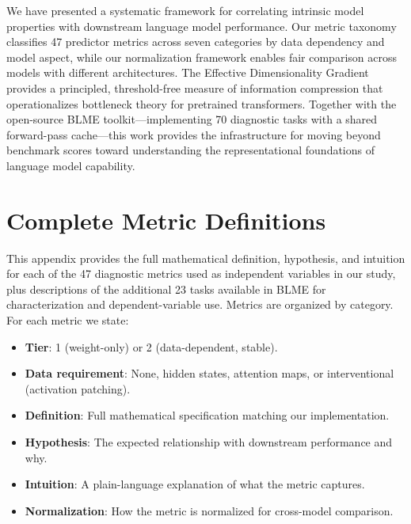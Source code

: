 \documentclass{article}
\begin{document}
We have presented a systematic framework for correlating intrinsic model properties with downstream language model performance.
Our metric taxonomy classifies 47 predictor metrics across seven categories by data dependency and model aspect, while our normalization framework enables fair comparison across models with different architectures.
The Effective Dimensionality Gradient provides a principled, threshold-free measure of information compression that operationalizes bottleneck theory for pretrained transformers.
Together with the open-source BLME toolkit---implementing 70 diagnostic tasks with a shared forward-pass cache---this work provides the infrastructure for moving beyond benchmark scores toward understanding the representational foundations of language model capability.




\newpage
\appendix

\section{Complete Metric Definitions}
\label{app:metrics}

This appendix provides the full mathematical definition, hypothesis, and intuition for each of the 47 diagnostic metrics used as independent variables in our study, plus descriptions of the additional 23 tasks available in BLME for characterization and dependent-variable use. Metrics are organized by category. For each metric we state:
\begin{itemize}
  \item \textbf{Tier}: 1 (weight-only) or 2 (data-dependent, stable).
  \item \textbf{Data requirement}: None, hidden states, attention maps, or interventional (activation patching).
  \item \textbf{Definition}: Full mathematical specification matching our implementation.
  \item \textbf{Hypothesis}: The expected relationship with downstream performance and why.
  \item \textbf{Intuition}: A plain-language explanation of what the metric captures.
  \item \textbf{Normalization}: How the metric is normalized for cross-model comparison.
\end{itemize}
\end{document}
